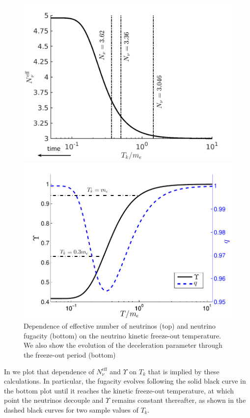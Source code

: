 \begin{figure}
\centerline{\includegraphics[width=0.80\linewidth]{04-birrell/ModelIndStudy/Figures/N_eff.pdf}}
\centerline{\includegraphics[width=0.80\linewidth]{04-birrell/ModelIndStudy/Figures/Upsilon_q.pdf}}
\caption{Dependence of  effective number of neutrinos (top) and neutrino fugacity (bottom) on the neutrino kinetic freeze-out temperature. We also show the evolution of the deceleration parameter through the freeze-out period (bottom)}
\label{fig:Tk_dependence}
\end{figure}
 In  we plot that dependence of $N^{\mathrm{eff}}_\nu$ and $\Upsilon$  on $T_k$ that is implied by these calculations.  In particular, the fugacity evolves following the solid black curve in the bottom plot until it reaches the kinetic freeze-out temperature, at which point the neutrinos decouple and $\Upsilon$ remains constant thereafter, as shown in the dashed black curves for two sample values of $T_k$. 
 

